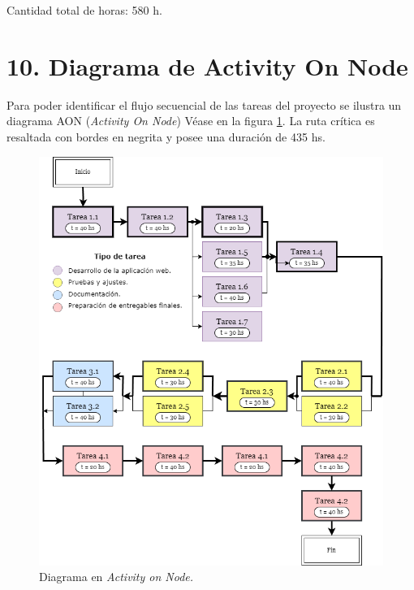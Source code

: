 \documentclass[
11pt, %
codirector, %
]{charter}
\begin{document}
Cantidad total de horas: 580 h.

\section{10. Diagrama de Activity On Node}
\label{sec:AoN}
Para poder identificar el flujo secuencial de las tareas del proyecto se ilustra un diagrama AON (\textit{Activity On Node}) Véase en la figura \ref{fig:AoN}. La ruta crítica es resaltada con bordes en negrita y posee una duración de 435 hs.

\begin{figure}[htpb]
\centering 
\includegraphics[width=.85\textwidth]{./Figuras/AON.png}
\caption{Diagrama en \textit{Activity on Node.}}
\label{fig:AoN}
\end{figure}
\end{document}
